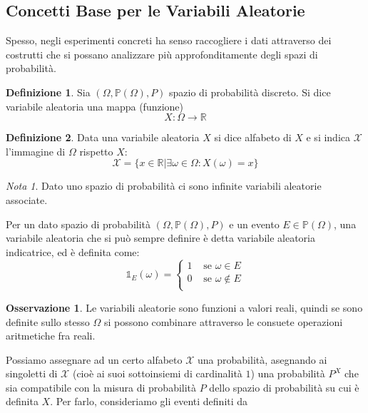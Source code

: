 \documentclass{article}
\theoremstyle{plain}
\theoremstyle{definition}
\newtheorem{definizione}{Definizione}[section]
\newtheorem{osservazione}{Osservazione}[section]
\theoremstyle{remark}
\newtheorem*{nota}{Nota}
\begin{document}
\subsection{Concetti Base per le Variabili Aleatorie} %
\label{sub:concetti_base_per_le_variabili_aleatorie}
Spesso, negli esperimenti concreti ha senso raccogliere i dati attraverso dei costrutti che si possano analizzare più approfonditamente degli spazi di probabilità.
\begin{definizione}
	Sia $(\Omega, \mathds{P}(\Omega), P)$ spazio di probabilità discreto. Si dice variabile aleatoria una mappa (funzione)
	\begin{equation*}
		X\colon \Omega\to\mathds{R}
	\end{equation*}
\end{definizione}
\begin{definizione}
	Data una variabile aleatoria $X$ si dice alfabeto di $X$ e si indica $\mathcal{X}$ l'immagine di $\Omega$ rispetto $X$:
	\begin{equation*}
		\mathcal{X}=\{x\in\mathds{R}\vert \exists \omega\in\Omega\colon X(\omega)=x\}
	\end{equation*}
\end{definizione}
\begin{nota}
	Dato uno spazio di probabilità ci sono infinite variabili aleatorie associate.
\end{nota}
Per un dato spazio di probabilità $(\Omega, \mathds{P}(\Omega), P)$ e un evento $E\in\mathds{P}(\Omega)$, una variabile aleatoria che si può sempre definire è detta variabile aleatoria indicatrice, ed è definita come:
\begin{equation*}
	\mathds{1}_E(\omega)=
	\begin{cases}
		1&\text{ se }\omega\in E\\
		0&\text{ se }\omega\notin E\\
	\end{cases}
\end{equation*}
\begin{osservazione}
	Le variabili aleatorie sono funzioni a valori reali, quindi se sono definite sullo stesso $\Omega$ si possono combinare attraverso le consuete operazioni aritmetiche fra reali.
\end{osservazione}
Possiamo assegnare ad un certo alfabeto $\mathcal{X}$ una probabilità, asegnando ai singoletti di $\mathcal{X}$ (cioè ai suoi sottoinsiemi di cardinalità $1$) una probabilità $P^X$ che sia compatibile con la misura di probabilità $P$ dello spazio di probabilità su cui è definita $X$. Per farlo, consideriamo gli eventi definiti da
\end{document}
